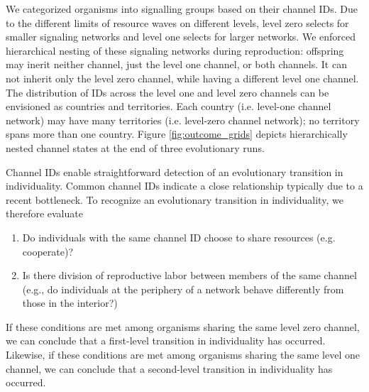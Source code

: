 We categorized organisms into signalling groups based on their channel IDs.
Due to the different limits of resource waves on different levels, level zero selects for smaller signaling networks and level one selects for larger networks.
We enforced hierarchical nesting of these signaling networks during reproduction:
offspring may inerit neither channel, just the level one channel, or both channels.  It can not inherit only the level zero channel, while having a different level one channel.
The distribution of IDs across the level one and level zero channels can be envisioned as countries and territories.  Each country (i.e. level-one channel network) may have many territories (i.e. level-zero channel network); no territory spans more than one country.
Figure \ref{fig:outcome_grids} depicts hierarchically nested channel states at the end of three evolutionary runs.

Channel IDs enable straightforward detection of an evolutionary transition in individuality.
Common channel IDs indicate a close relationship typically due to a recent bottleneck.  %
To recognize an evolutionary transition in individuality, we therefore evaluate
\begin{enumerate}
\item Do individuals with the same channel ID choose to share resources (e.g. cooperate)?
\item Is there division of reproductive labor between members of the same channel %
(e.g., do individuals at the periphery of a network behave differently from those in the interior?)
\end{enumerate}
If these conditions are met among organisms sharing the same level zero channel, we can conclude that a first-level transition in individuality has occurred.
Likewise, if these conditions are met among organisms sharing the same level one channel, we can conclude that a second-level transition in individuality has occurred.

